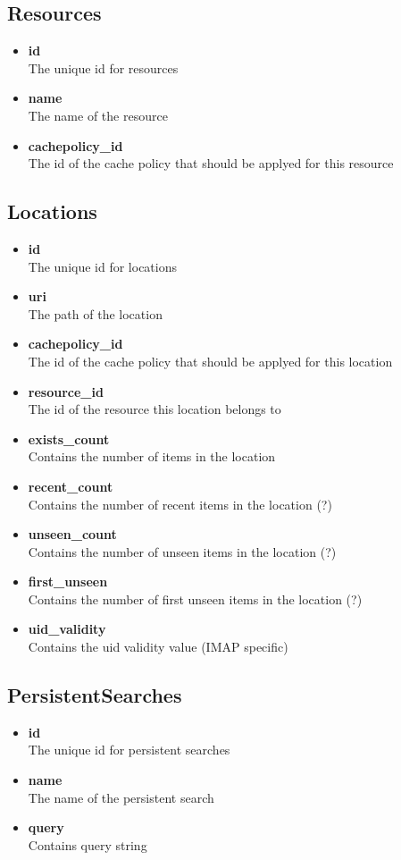 \documentclass[]{report}
\begin{document}
\subsection{Resources}
\begin{itemize}
  \item \textbf{id}\\
    The unique id for resources
  \item \textbf{name}\\
    The name of the resource
  \item \textbf{cachepolicy\_id}\\
    The id of the cache policy that should be applyed for this resource
\end{itemize}

\subsection{Locations}
\begin{itemize}
  \item \textbf{id}\\
    The unique id for locations
  \item \textbf{uri}\\
    The path of the location
  \item \textbf{cachepolicy\_id}\\
    The id of the cache policy that should be applyed for this location
  \item \textbf{resource\_id}\\
    The id of the resource this location belongs to
  \item \textbf{exists\_count}\\
    Contains the number of items in the location
  \item \textbf{recent\_count}\\
    Contains the number of recent items in the location (?)
  \item \textbf{unseen\_count}\\
    Contains the number of unseen items in the location (?)
  \item \textbf{first\_unseen}\\
    Contains the number of first unseen items in the location (?)
  \item \textbf{uid\_validity}\\
    Contains the uid validity value (IMAP specific)
\end{itemize}

\subsection{PersistentSearches}
\begin{itemize}
  \item \textbf{id}\\
    The unique id for persistent searches
  \item \textbf{name}\\
    The name of the persistent search
  \item \textbf{query}\\
    Contains query string
\end{itemize}
\end{document}
